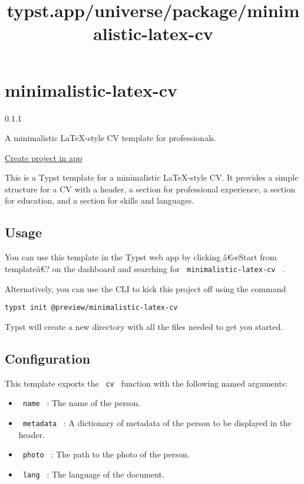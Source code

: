 \title{typst.app/universe/package/minimalistic-latex-cv}

\label{banner}
\label{template-thumbnail}

\section{minimalistic-latex-cv}\label{minimalistic-latex-cv}

{ 0.1.1 }

A minimalistic LaTeX-style CV template for professionals.

\href{/app?template=minimalistic-latex-cv&version=0.1.1}{Create project
in app}

\label{readme}
This is a Typst template for a minimalistic LaTeX-style CV. It provides
a simple structure for a CV with a header, a section for professional
experience, a section for education, and a section for skills and
languages.

\subsection{Usage}\label{usage}

You can use this template in the Typst web app by clicking â€œStart from
templateâ€? on the dashboard and searching for
\texttt{\ minimalistic-latex-cv\ } .

Alternatively, you can use the CLI to kick this project off using the
command

\begin{verbatim}
typst init @preview/minimalistic-latex-cv
\end{verbatim}

Typst will create a new directory with all the files needed to get you
started.

\subsection{Configuration}\label{configuration}

This template exports the \texttt{\ cv\ } function with the following
named arguments:

\begin{itemize}
\tightlist
\item
  \texttt{\ name\ } : The name of the person.
\item
  \texttt{\ metadata\ } : A dictionary of metadata of the person to be
  displayed in the header.
\item
  \texttt{\ photo\ } : The path to the photo of the person.
\item
  \texttt{\ lang\ } : The language of the document.
\end{itemize}

